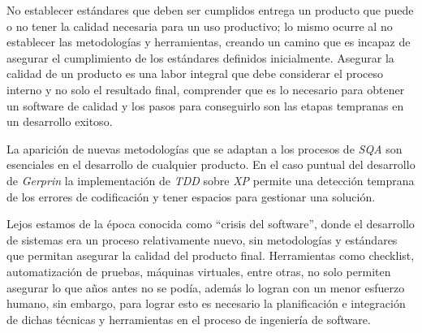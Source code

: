 No establecer estándares que deben ser cumplidos entrega un producto que puede o no tener la calidad necesaria para un uso productivo; lo mismo ocurre al no establecer las metodologías y herramientas, creando un camino que es incapaz de asegurar el cumplimiento de los estándares definidos inicialmente. Asegurar la calidad de un producto es una labor integral que debe considerar el proceso interno y no solo el resultado final, comprender que es lo necesario para obtener un software de calidad y los pasos para conseguirlo son las etapas tempranas en un desarrollo exitoso. 

La aparición de nuevas metodologías que se adaptan a los procesos de \textit{SQA} son esenciales en el desarrollo de cualquier producto. En el caso puntual del desarrollo de \textit{Gerprin} la implementación de \textit{TDD} sobre \textit{XP} permite una detección temprana de los errores de codificación y tener espacios para gestionar una solución. 

Lejos estamos de la época conocida como “crisis del software”, donde el desarrollo de sistemas era un proceso relativamente nuevo, sin metodologías y estándares que permitan asegurar la calidad del producto final. Herramientas como checklist, automatización de pruebas, máquinas virtuales, entre otras, no solo permiten asegurar lo que años antes no se podía, además lo logran con un menor esfuerzo humano, sin embargo, para lograr esto es necesario la planificación e integración de dichas técnicas y herramientas en el proceso de ingeniería de software. 
